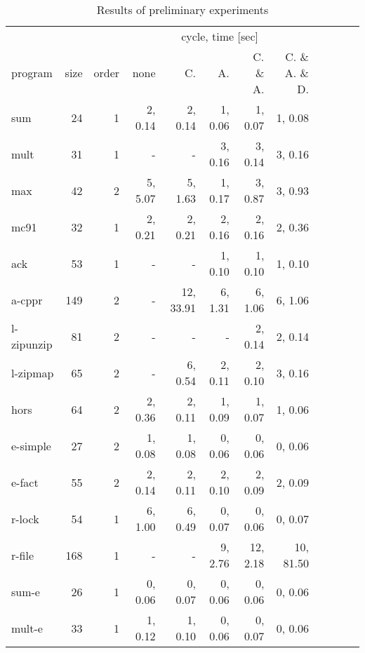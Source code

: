 \begin{table*}
\caption{Results of preliminary experiments}
\label{tbl:exp}
\small
\begin{center}
\begin{tabular}{|l|r|r|r|r|r|r|r|r|r|r|r|}
\hline
            &       &    & \multicolumn{5}{|c|}{cycle, time [sec]} \\
\cline{4-8}
program    & size & order & none &     C. &   A. &    C. \& A. & C. \& A. \& D. \\
\hline
sum               &    24&  1&  2,    0.14 &  2,    0.14 &  1,    0.06 &  1,    0.07 &  1,    0.08 \\
mult              &    31&  1&           - &           - &  3,    0.16 &  3,    0.14 &  3,    0.16 \\
max               &    42&  2&  5,    5.07 &  5,    1.63 &  1,    0.17 &  3,    0.87 &  3,    0.93 \\
mc91              &    32&  1&  2,    0.21 &  2,    0.21 &  2,    0.16 &  2,    0.16 &  2,    0.36 \\
ack               &    53&  1&           - &           - &  1,    0.10 &  1,    0.10 &  1,    0.10 \\
a-cppr            &   149&  2&           - & 12,   33.91 &  6,    1.31 &  6,    1.06 &  6,    1.06 \\
l-zipunzip        &    81&  2&           - &           - &           - &  2,    0.14 &  2,    0.14 \\
l-zipmap          &    65&  2&           - &  6,    0.54 &  2,    0.11 &  2,    0.10 &  3,    0.16 \\
hors              &    64&  2&  2,    0.36 &  2,    0.11 &  1,    0.09 &  1,    0.07 &  1,    0.06 \\
e-simple          &    27&  2&  1,    0.08 &  1,    0.08 &  0,    0.06 &  0,    0.06 &  0,    0.06 \\
e-fact            &    55&  2&  2,    0.14 &  2,    0.11 &  2,    0.10 &  2,    0.09 &  2,    0.09 \\
r-lock            &    54&  1&  6,    1.00 &  6,    0.49 &  0,    0.07 &  0,    0.06 &  0,    0.07 \\
r-file            &   168&  1&           - &           - &  9,    2.76 & 12,    2.18 & 10,   81.50 \\
sum-e             &    26&  1&  0,    0.06 &  0,    0.07 &  0,    0.06 &  0,    0.06 &  0,    0.06 \\
mult-e            &    33&  1&  1,    0.12 &  1,    0.10 &  0,    0.06 &  0,    0.07 &  0,    0.06 \\

\end{tabular}
\end{center}
\end{table*}
